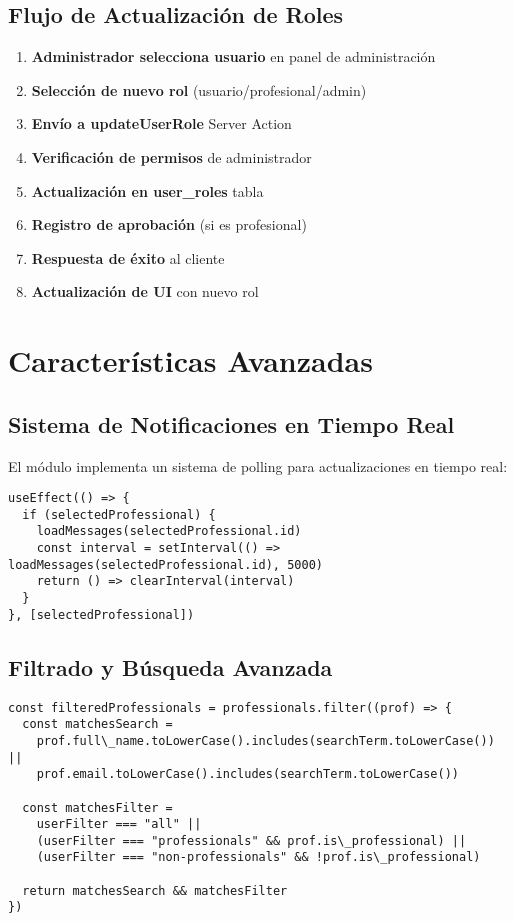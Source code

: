 \documentclass[12pt,a4paper]{article}
\begin{document}
\subsection{Flujo de Actualización de Roles}

\begin{enumerate}
    \item \textbf{Administrador selecciona usuario} en panel de administración
    \item \textbf{Selección de nuevo rol} (usuario/profesional/admin)
    \item \textbf{Envío a updateUserRole} Server Action
    \item \textbf{Verificación de permisos} de administrador
    \item \textbf{Actualización en user\_roles} tabla
    \item \textbf{Registro de aprobación} (si es profesional)
    \item \textbf{Respuesta de éxito} al cliente
    \item \textbf{Actualización de UI} con nuevo rol
\end{enumerate}

\section{Características Avanzadas}

\subsection{Sistema de Notificaciones en Tiempo Real}

El módulo implementa un sistema de polling para actualizaciones en tiempo real:

\begin{lstlisting}[caption=Implementación de polling]
useEffect(() => {
  if (selectedProfessional) {
    loadMessages(selectedProfessional.id)
    const interval = setInterval(() => loadMessages(selectedProfessional.id), 5000)
    return () => clearInterval(interval)
  }
}, [selectedProfessional])
\end{lstlisting}

\subsection{Filtrado y Búsqueda Avanzada}

\begin{lstlisting}[caption=Filtrado de contactos]
const filteredProfessionals = professionals.filter((prof) => {
  const matchesSearch =
    prof.full\_name.toLowerCase().includes(searchTerm.toLowerCase()) ||
    prof.email.toLowerCase().includes(searchTerm.toLowerCase())

  const matchesFilter =
    userFilter === "all" ||
    (userFilter === "professionals" && prof.is\_professional) ||
    (userFilter === "non-professionals" && !prof.is\_professional)

  return matchesSearch && matchesFilter
})
\end{lstlisting}
\end{document}
